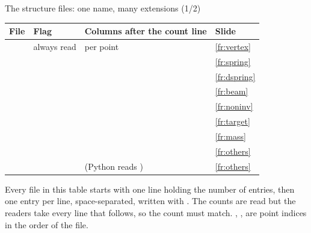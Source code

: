 \documentclass[aspectratio=169,11pt]{beamer}
\begin{document}
\begin{frame}{The structure files: one name, many extensions (1/2)}
\label{fr:family}
\scriptsize
\begin{tabular}{@{}L{0.13\textwidth}L{0.2\textwidth}L{0.34\textwidth}L{0.18\textwidth}@{}}
\toprule
File & Flag & Columns after the count line & Slide \\
\midrule
{} & always read &  per point & \ref{fr:vertex} \\
 &  &  & \ref{fr:spring} \\
 &  &  & \ref{fr:dspring} \\
 &  &  & \ref{fr:beam} \\
 &  &  & \ref{fr:noninv} \\
 &  &  & \ref{fr:target} \\
 &  &  & \ref{fr:mass} \\
 &  &  & \ref{fr:others} \\
 &  &  (Python reads ) & \ref{fr:others} \\
\bottomrule
\end{tabular}

\vspace{1mm}
\small Every file in this table starts with one line holding the number of entries, then one entry per line, space-separated, written with . The counts are read but the readers take every line that follows, so the count must match. , ,  are point indices in the order of the  file.
\end{frame}
\end{document}
